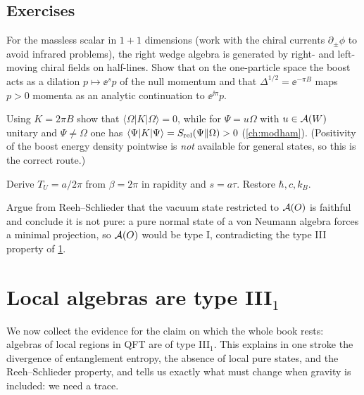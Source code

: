 \subsection*{Exercises}
\begin{exercise}\label{ex:rs_bw:1}
For the massless scalar in $1+1$ dimensions (work with the chiral currents $\partial_\pm\phi$ to avoid infrared problems), the right wedge algebra is generated by right- and left-moving chiral fields on half-lines. Show that on the one-particle space the boost acts as a dilation $p\mapsto\ee^{s}p$ of the null momentum and that $\Delta^{1/2}=\ee^{-\pi B}$ maps $p>0$ momenta as an analytic continuation to $\ee^{\ii\pi}p$.
\end{exercise}
\begin{exercise}\label{ex:rs_bw:2}
Using $K=2\pi B$ show that $\langle\Omega|K|\Omega\rangle=0$, while for $\Psi=u\Omega$ with $u\in\mathcal{A}(W)$ unitary and $\Psi\ne\Omega$ one has $\langle\Psi|K|\Psi\rangle=S_{\rm rel}(\Psi\|\Omega)>0$ (\cref{ch:modham}). (Positivity of the boost energy density pointwise is \emph{not} available for general states, so this is the correct route.)
\end{exercise}
\begin{exercise}\label{ex:rs_bw:3}
Derive $T_U=a/2\pi$ from $\beta=2\pi$ in rapidity and $s=a\tau$. Restore $\hbar,c,k_B$.
\end{exercise}
\begin{exercise}\label{ex:rs_bw:4}
Argue from Reeh--Schlieder that the vacuum state restricted to $\mathcal{A}(O)$ is faithful and conclude it is not pure: a pure normal state of a von Neumann algebra forces a minimal projection, so $\mathcal{A}(O)$ would be type I, contradicting the type III property of \cref{ch:typeIII_local}.
\end{exercise}

\section{Local algebras are type III$_1$}\label{ch:typeIII_local}

\begin{physmotiv}
We now collect the evidence for the claim on which the whole book rests: algebras of local regions in QFT are of type III$_1$. This explains in one stroke the divergence of entanglement entropy, the absence of local pure states, and the Reeh--Schlieder property, and tells us exactly what must change when gravity is included: we need a trace.
\end{physmotiv}

